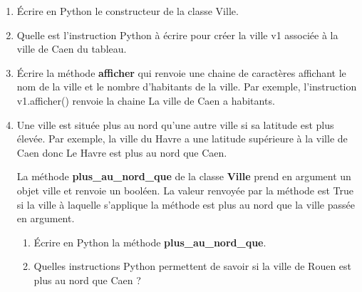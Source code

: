 \documentclass[11pt,a4paper]{article}
\newcounter{num}
\begin{document}
\begin{enumerate}
\item Écrire en Python le constructeur de la classe \textsf{Ville}.
\item Quelle est l'instruction Python à écrire pour créer la ville \textsf{v1} associée à la ville de Caen du tableau.
\item Écrire la méthode \textbf{afficher} qui renvoie une chaine de caractères affichant le nom de la ville et le nombre d'habitants de la ville. Par exemple, l'instruction \textsf{v1.afficher()} renvoie la chaine \textsf{La ville de Caen a  habitants.} \medskip


\item Une ville est située plus au nord qu'une autre ville si sa latitude est plus élevée. Par exemple, la ville du Havre a une latitude supérieure à la ville de Caen donc Le Havre est plus au nord que Caen. \medskip

La méthode \textbf{plus\_au\_nord\_que} de la classe \textbf{Ville} prend en argument un objet ville et renvoie un booléen. La valeur renvoyée par la méthode est True si la ville à laquelle s'applique la méthode est plus au nord que la ville passée en argument. \medskip

\begin{enumerate}
\item Écrire en Python la méthode \textbf{plus\_au\_nord\_que}.

\item Quelles instructions Python permettent de savoir si la ville de Rouen est plus au nord que Caen ?
\end{enumerate}


\end{enumerate}  
\end{document}
